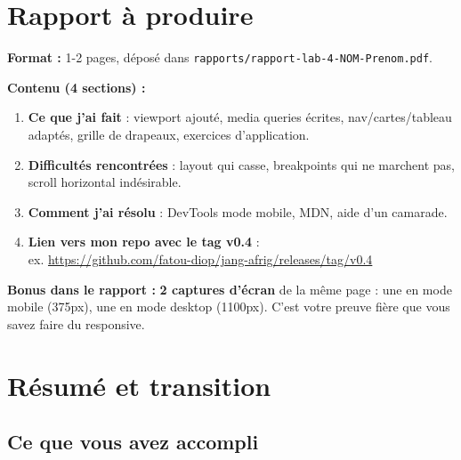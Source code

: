 \documentclass[11pt,a4paper]{article}
\begin{document}
\section{Rapport à produire}

\begin{attentionbox}
\textbf{Format :} 1-2 pages, déposé dans \texttt{rapports/rapport-lab-4-NOM-Prenom.pdf}.

\medskip

\textbf{Contenu (4 sections) :}
\begin{enumerate}[nosep]
    \item \textbf{Ce que j'ai fait} : viewport ajouté, media queries écrites, nav/cartes/tableau adaptés, grille de drapeaux, exercices d'application.
    \item \textbf{Difficultés rencontrées} : layout qui casse, breakpoints qui ne marchent pas, scroll horizontal indésirable.
    \item \textbf{Comment j'ai résolu} : DevTools mode mobile, MDN, aide d'un camarade.
    \item \textbf{Lien vers mon repo avec le tag v0.4} : \\
          ex. \url{https://github.com/fatou-diop/jang-afrig/releases/tag/v0.4}
\end{enumerate}

\medskip

\textbf{Bonus dans le rapport :} \textbf{2 captures d'écran} de la même
page : une en mode mobile (375px), une en mode desktop (1100px). C'est
votre preuve fière que vous savez faire du responsive.
\end{attentionbox}

\newpage

\section{Résumé et transition}

\subsection{Ce que vous avez accompli}
\end{document}
